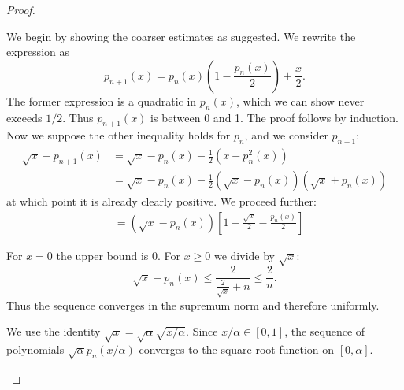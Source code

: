 \begin{proof}
	\begin{parts}
		\item We begin by showing the coarser estimates as suggested. We rewrite the expression as
		\[p_{n+1}(x) =p_n(x)\left(1-\frac{p_n(x)}{2}\right)+\frac{x}{2}.\]
		The former expression is a quadratic in $p_n(x)$, which we can show never exceeds $1/2$. Thus $p_{n+1}(x)$ is between 0 and 1. The proof follows by induction. Now we suppose the other inequality holds for $p_n$, and we consider $p_{n+1}$:
		\begin{align*}
			\sqrt{x}-p_{n+1}(x)&=\sqrt{x}-p_n(x)-\frac{1}{2}(x-p_n^2(x))\\
			&=\sqrt{x}-p_n(x)-\frac{1}{2}(\sqrt{x}-p_n(x))(\sqrt{x}+p_n(x))
		\end{align*}
	at which point it is already clearly positive. We proceed further:
	\begin{align*}
		&=(\sqrt{x}-p_n(x))\left[1-\frac{\sqrt{x}}{2}-\frac{p_n(x)}{2}\right]
	\end{align*}
	\item For $x=0$ the upper bound is $0$. For $x\ge 0$ we divide by $\sqrt{x}$:
	\[\sqrt{x}-p_n(x)\le \frac{2}{\frac{2}{\sqrt{x}}+n}\le\frac{2}{n}.\]
	Thus the sequence converges in the supremum norm and therefore uniformly.
	\item We use the identity $\sqrt{x} = \sqrt{\alpha}\sqrt{x/\alpha}$. Since $x/\alpha\in [0,1]$, the sequence of polynomials $\sqrt{\alpha}p_n(x/\alpha)$ converges to the square root function on $[0,\alpha]$.
	\item 
	\end{parts}
\end{proof}